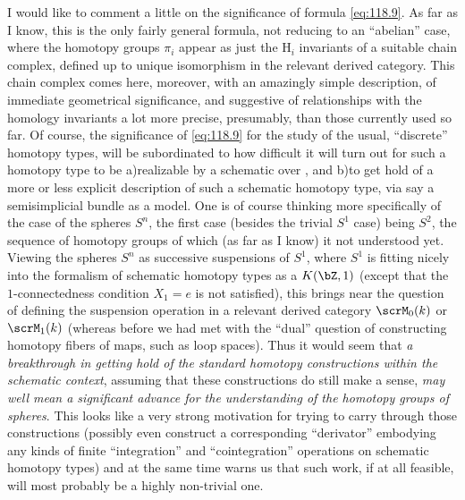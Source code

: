 I would like to comment a little on the significance of formula
\eqref{eq:118.9}. As far as I know, this is the only fairly general
formula, not reducing to an ``abelian'' case, where the homotopy
groups $\pi_i$ appear as just the $\mathrm H_i$ invariants of a
suitable chain complex, defined up to unique isomorphism in the
relevant derived category. This chain complex comes here, moreover,
with an amazingly simple description, of immediate geometrical
significance, and suggestive of relationships with the
homology invariants a lot more precise, presumably, than those
currently used so far. Of course, the significance of \eqref{eq:118.9}
for the study of the usual, ``discrete'' homotopy types, will be
subordinated to how difficult it will turn out for such a homotopy
type to be a)\enspace realizable by a schematic over \bZ, and
b)\enspace to get hold of a more or less explicit description of such
a schematic homotopy type, via say a semisimplicial bundle as a
model. One is of course thinking more specifically of the case of the
spheres $S^n$, the first case (besides the trivial $S^1$ case) being
$S^2$, the sequence of homotopy groups of which (as far as I know) it
not understood yet. Viewing the spheres $S^n$ as successive
suspensions of $S^1$, where $S^1$ is fitting nicely into the formalism
of schematic homotopy types as a $K(\bZ,1)$ (except that the
$1$-connectedness condition $X_1=e$ is not satisfied), this brings
near the question of defining the suspension operation in a relevant
derived category $\scrM_0(k)$ or $\scrM_1(k)$ (whereas before we had
met with the ``dual'' question of constructing homotopy fibers of
maps, such as loop spaces). Thus it would seem that \emph{a
  breakthrough in getting hold of the standard homotopy constructions
  within the schematic context}, assuming that these constructions do
still make a sense, \emph{may well mean a significant advance for the
  understanding of the homotopy groups of spheres}. This looks like a
very strong motivation for trying to carry through those constructions
(possibly even construct a corresponding ``derivator'' embodying any
kinds of finite ``integration'' and ``cointegration'' operations on
schematic homotopy types) and at the same time warns us that such
work, if at all feasible, will most probably be a highly non-trivial
one.

